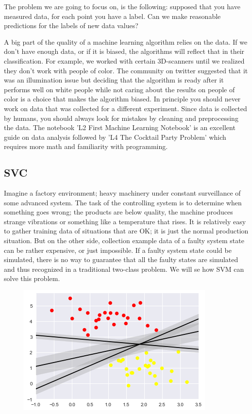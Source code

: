 \documentclass[11pt,letterpaper]{report}
\begin{document}
	
	The problem we are going to focus on, is the following: supposed that you have measured data, for each point you have a label. Can we make reasonable predictions for the labels of  new data values?
	
	 A big part of the quality of a machine learning algorithm relies on the data. If we don't have enough data, or if it is biased, the algorithms will reflect that in their classification. For example, we worked with certain 3D-scanners until we realized they don't work with people of color. The community on twitter suggested that it was an illumination issue but deciding that the algorithm is ready after it performs well on white people while not caring about the results on people of color is a choice that makes the algorithm biased. In principle you should never work on data that was collected for a different experiment. Since data is collected by humans, you should always look for mistakes by cleaning and preprocessing the data. The  notebook 'L2 First Machine Learning Notebook' is an excellent guide on data analysis followed by 'L4 The Cocktail Party Problem' which requires more math and familiarity with programming.
	 	
	\subsection{SVC}
	Imagine a factory environment; heavy machinery under constant surveillance of some advanced system. The task of the controlling system is to determine when something goes wrong; the products are below quality, the machine produces strange vibrations or something like a temperature that rises. It is relatively easy to gather training data of situations that are OK; it is just the normal production situation. But on the other side, collection example data of a faulty system state can be rather expensive, or just impossible. If a faulty system state could be simulated, there is no way to guarantee that all the faulty states are simulated and thus recognized in a traditional two-class problem. We will se how SVM can solve this problem.
	
	\begin{figure}[h!]
		\centering
		\includegraphics[width=0.45\linewidth]{figures/svcl.png}
		\caption{}
		\label{fig:lines}
	\end{figure} 
	
\end{document}
